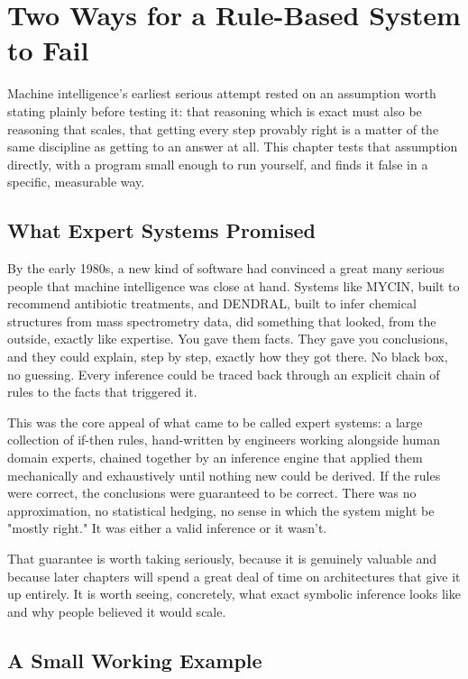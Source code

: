 \chapter{Two Ways for a Rule-Based System to Fail}

Machine intelligence's earliest serious attempt rested on an assumption worth stating plainly before testing it: that reasoning which is exact must also be reasoning that scales, that getting every step provably right is a matter of the same discipline as getting to an answer at all. This chapter tests that assumption directly, with a program small enough to run yourself, and finds it false in a specific, measurable way.

\section*{What Expert Systems Promised}

By the early 1980s, a new kind of software had convinced a great many serious people that machine intelligence was close at hand. Systems like MYCIN, built to recommend antibiotic treatments, and DENDRAL, built to infer chemical structures from mass spectrometry data, did something that looked, from the outside, exactly like expertise. You gave them facts. They gave you conclusions, and they could explain, step by step, exactly how they got there. No black box, no guessing. Every inference could be traced back through an explicit chain of rules to the facts that triggered it.

This was the core appeal of what came to be called expert systems: a large collection of if-then rules, hand-written by engineers working alongside human domain experts, chained together by an inference engine that applied them mechanically and exhaustively until nothing new could be derived. If the rules were correct, the conclusions were guaranteed to be correct. There was no approximation, no statistical hedging, no sense in which the system might be "mostly right." It was either a valid inference or it wasn't.

That guarantee is worth taking seriously, because it is genuinely valuable and because later chapters will spend a great deal of time on architectures that give it up entirely. It is worth seeing, concretely, what exact symbolic inference looks like and why people believed it would scale.

\section*{A Small Working Example}

